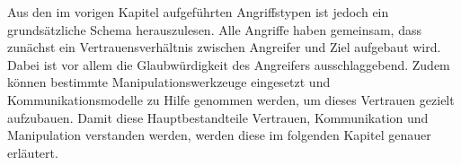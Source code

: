 Aus den im vorigen Kapitel aufgeführten Angriffstypen ist jedoch ein grundsätzliche Schema herauszulesen.
Alle Angriffe haben gemeinsam, dass zunächst ein Vertrauensverhältnis zwischen Angreifer und Ziel aufgebaut wird.
Dabei ist vor allem die Glaubwürdigkeit des Angreifers ausschlaggebend.
Zudem können bestimmte Manipulationswerkzeuge eingesetzt und Kommunikationsmodelle zu Hilfe genommen werden, um dieses Vertrauen gezielt aufzubauen.
Damit diese Hauptbestandteile Vertrauen, Kommunikation und Manipulation verstanden werden, werden diese im folgenden Kapitel genauer erläutert.


